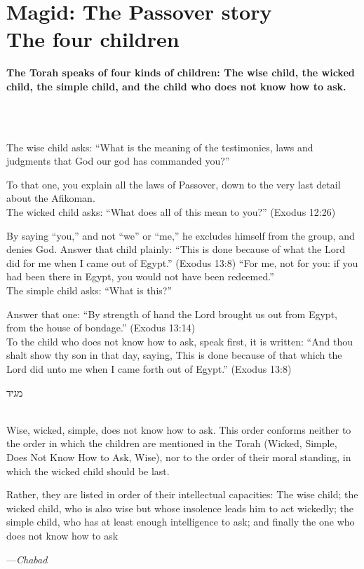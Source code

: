 \documentclass[a4paper,10pt,openany]{memoir}
\newcommand{\HgSource}[1]{\hfill{\small---\itshape{#1}}}
\newcommand{\hchapter}[1]{
  \begin{hebrew}
    \begin{Spacing}{.97}
      \newpage
      \strut

      \vspace{.15em}

      \noindent\Huge #1

      \vspace{1em}
    \end{Spacing}
  \end{hebrew}
}
\newcommand{\HgHL}[1]{{\Large\textbf{#1}\par\noindent\\[-.5em]}}
\newenvironment{HgEnglish}{\strut\\\noindent}{\vspace{1em}}
\newcommand{\LSrc}{\textsuperscript{\upshape{[L]}}}
\begin{document}
\vfill

\chapter*{Magid: The Passover story \\ {\LARGE The four children}}

\vfill

\HgHL{The Torah speaks of four kinds of children: The wise child, the wicked
  child, the simple child, and the child who does not know how to ask.}\\
The wise child asks: ``What is the meaning of the testimonies, laws and
judgments that God our god has commanded you?''

To that one, you explain all the laws of Passover, down to the very last detail
about the Afikoman. \\[1em]
The wicked child asks: ``What does all of this mean to you?'' (Exodus 12:26)

By saying ``you,'' and not ``we'' or ``me,'' he excludes himself from the group,
and denies God. Answer that child plainly: ``This is done because of what the
Lord did for me when I came out of Egypt.'' (Exodus 13:8) ``For me, not for you:
if you had been there in Egypt, you would not have been redeemed.''\\[1em]
The simple child asks: ``What is this?'' 

Answer that one: ``By strength of hand the Lord brought us out from Egypt, from
the house of bondage.'' (Exodus 13:14)\\[1em]
To the child who does not know how to ask, speak first, it is written: ``And
thou shalt show thy son in that day, saying, This is done because of that which
the Lord did unto me when I came forth out of Egypt.'' (Exodus 13:8) \LSrc

\vfill

\hchapter{מגיד}

\begin{HgEnglish}
Wise, wicked, simple, does not know how to ask. This order conforms neither to
the order in which the children are mentioned in the Torah (Wicked, Simple, Does
Not Know How to Ask, Wise), nor to the order of their moral standing, in which
the wicked child should be last.

Rather, they are listed in order of their intellectual capacities: The wise
child; the wicked child, who is also wise but whose insolence leads him to act
wickedly; the simple child, who has at least enough intelligence to ask; and
finally the one who does not know how to ask

\HgSource{Chabad}
\end{HgEnglish}
\end{document}
